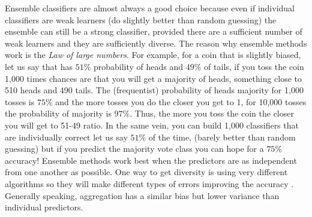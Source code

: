 \documentclass[11pt]{article}
\theoremstyle{definition}
\theoremstyle{remark}
\begin{document}
Ensemble classifiers are almost always a good choice because even if individual classifiers are weak learners (do slightly better than random guessing) the ensemble can still be a strong classifier, provided there are a sufficient number of weak learners and they are sufficiently diverse. %
The reason why ensemble methods work is the \emph{Law of large numbers}. For example, for a coin that is slightly biased, let us say that has $51\%$ probability of heads and $49\%$ of tails, if you toss the coin 1,000 times chances are that you will get a majority of heads, something close to 510 heads and 490 tails. The (frequentist) probability of heads majority for 1,000 tosses is $75\%$ and the more tosses you do the closer you get to 1, for 10,000 tosses the probability of majority is $97\%$. Thus, the more you toss the coin the closer you will get to 51-49 ratio. In the same vein, you can build 1,000 classifiers that are individually correct let us say $51\%$ of the time, (barely better than random guessing) but if you predict the majority vote class you can hope for a $75\%$ accuracy! Ensemble methods work best when the predictors are as independent from one another as possible. One way to get diversity is using very different algorithms so they will make different types of errors improving the accuracy \cite{geron2017hands}. Generally speaking, aggregation has a similar bias but lower variance than individual predictors.
\end{document}
